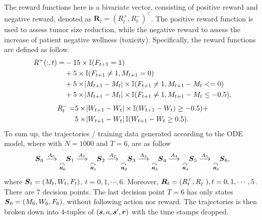 The reward functions here is a bivariate vector, consisting of positive reward and negative reward, denoted as $\boldsymbol{R}_t = ( R^+_t , R^-_t )^\intercal$. The positive reward function is used to assess tumor size reduction, while the negative reward to assess the increase of patient negative wellness (toxicity). Specifically, the reward functions are defined as follow. 
\begin{equation}
\begin{split}
R^{+}(:, t)  =  &  -15 \times \mathbb{I}( F_{ t+1} = 1) \\
& + 5 \times \mathbb{I}(  F_{ t+1 } \neq 1 , M_{ t+1} = 0 )   \\
&  + 5 \times \abs{ M_{t+1} - M_{t} } \times \mathbb{I}(  F_{ t+1} \neq 1, M_{ t+1 } - M_{t} <= 0  ) \\
& + 5 \times \abs{ M_{ t+1} - M_{t} } \times \mathbb{I}(  F_{ t+1 } \neq  1 , M_{t+1} - M_t \leq -0.5 ),
\end{split}
\end{equation}
\begin{equation}
\begin{split}
R^{-}_t = & 5 \times \abs{ W_{t+1} - W_{t} }  \times \mathbb{I} ( W_{t+1} - W_t) \ge -0.5 ) + \\
 & 5 \times \abs{ W_{ t+1} - W_{t} } \mathbb{I}( W_{t+1} - W_{t} \ge 0.5 ).
\end{split}
\end{equation}
To sum up, the trajectories / training data generated according to the ODE model, where with $N = 1000$ and $T = 6$, are as follow
$$\boldsymbol{S}_0 \overset{A_0}{\longrightarrow}\underset{\underset{\boldsymbol{R}_0}{\curvearrowright}}\, \boldsymbol{S}_1 \overset{A_1}{\longrightarrow} \underset{\underset{\boldsymbol{R}_1}{\curvearrowright}}\, \boldsymbol{S}_2 \overset{A_2}{\longrightarrow} \underset{\underset{\boldsymbol{R}_2}{\curvearrowright}}\,  \boldsymbol{S}_3 \overset{A_3}{\longrightarrow} \underset{\underset{\boldsymbol{R}_3}{\curvearrowright}}\,  \boldsymbol{S}_4 \overset{A_4}{\longrightarrow}  \underset{\underset{\boldsymbol{R}_4}{\curvearrowright}}\, \boldsymbol{S}_5 \overset{A_5}{\longrightarrow} \underset{\underset{\boldsymbol{R}_5}{\curvearrowright}}\,  \boldsymbol{S}_6, $$
where $\boldsymbol{S}_t = (M_t, W_t, F_t)$, $t = 0, 1, \cdots, 6$. Moreover, $\boldsymbol{R}_{t} = (R_t^+, R_t^-), t = 0, 1, \cdots, 5$. There are 7 decision points. The last decision point $T = 6$ has only states $\boldsymbol{S}_6 = (M_6, W_6, F_6)$, without following action nor reward. The trajectories is then broken down into 4-tuples of $(\boldsymbol{s}, a, \boldsymbol{s}^{\prime}, \boldsymbol{r})$ with the time stamps dropped.
